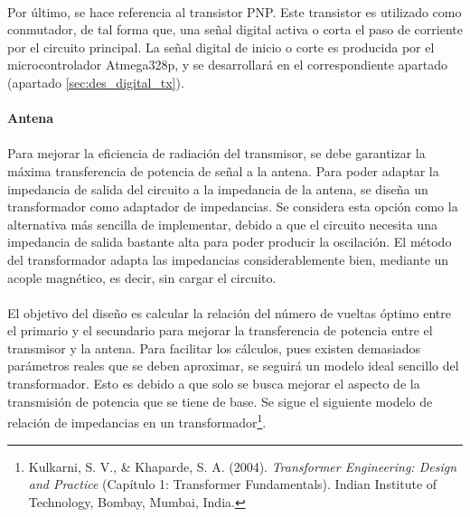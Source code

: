 \paragraph{} 
Por último, se hace referencia al transistor PNP. %
Este transistor es utilizado como conmutador, de tal forma que, una señal digital activa o corta el paso de corriente por el circuito principal. La señal digital de inicio o corte es producida por el microcontrolador Atmega328p, y se desarrollará en el correspondiente apartado (apartado \ref{sec:des_digital_tx}).

\paragraph{}
\paragraph{Antena} 
\paragraph{}
Para mejorar la eficiencia de radiación del transmisor, se debe garantizar la máxima transferencia de potencia de señal a la antena.
Para poder adaptar la impedancia de salida del circuito a la impedancia de la antena, se diseña un transformador como adaptador de impedancias. 
Se considera esta opción como la alternativa más sencilla de implementar, debido a que el circuito necesita una impedancia de salida bastante alta para poder producir la oscilación.
El método del transformador adapta las impedancias considerablemente bien, mediante un acople magnético, es decir, sin cargar el circuito.
\paragraph{}
El objetivo del diseño es calcular la relación del número de vueltas óptimo entre el primario y el secundario para mejorar la transferencia de potencia entre el transmisor y la antena. 
Para facilitar los cálculos, pues existen demasiados parámetros reales que se deben aproximar, se seguirá un modelo ideal sencillo del transformador. Esto es debido a que solo se busca mejorar el aspecto de la transmisión de potencia que se tiene de base.
Se sigue el siguiente modelo de relación de impedancias en un transformador\footnote{Kulkarni, S. V., \& Khaparde, S. A. (2004). \textit{Transformer Engineering: Design and Practice} (Capítulo 1: Transformer Fundamentals). Indian Institute of Technology, Bombay, Mumbai, India.}.

